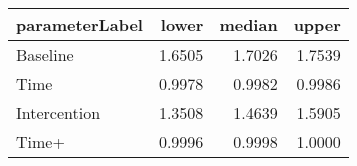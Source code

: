 \begin{table}[ht]
\centering
\begin{tabular}{lrrr}
  \hline
parameterLabel & lower & median & upper \\ 
  \hline
Baseline & 1.6505 & 1.7026 & 1.7539 \\ 
  Time & 0.9978 & 0.9982 & 0.9986 \\ 
  Intercention & 1.3508 & 1.4639 & 1.5905 \\ 
  Time+ & 0.9996 & 0.9998 & 1.0000 \\ 
   \hline
\end{tabular}
\end{table}
